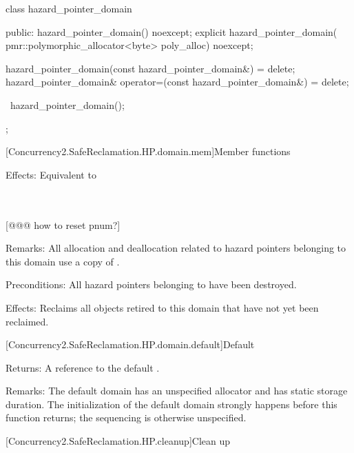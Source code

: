 \begin{codeblock}
class hazard_pointer_domain {
public:
  hazard_pointer_domain() noexcept;
  explicit hazard_pointer_domain(
    pmr::polymorphic_allocator<byte> poly_alloc) noexcept;

  hazard_pointer_domain(const hazard_pointer_domain&) = delete;
  hazard_pointer_domain& operator=(const hazard_pointer_domain&) = delete;

  ~hazard_pointer_domain();
};
\end{codeblock}

[Concurrency2.SafeReclamation.HP.domain.mem]{Member functions}


\pnum
Effects: Equivalent to\\
\hspace*{1.1em}
\\

\\
\hspace*{1.1em}

[@@@ how to reset pnum?]

\pnum
Remarks: All allocation and deallocation related to hazard pointers belonging to this
domain use a copy of .
\\


\pnum
Preconditions: All hazard pointers belonging to  have been destroyed.

\pnum
Effects: Reclaims all objects retired to this domain that have not yet been reclaimed.

[Concurrency2.SafeReclamation.HP.domain.default]{Default }


\pnum
Returns: A reference to the default .

\pnum
Remarks: The default domain has an unspecified allocator and has static storage
duration. The initialization of the default domain strongly happens before this function
returns; the sequencing is otherwise unspecified.

[Concurrency2.SafeReclamation.HP.cleanup]{Clean up}

